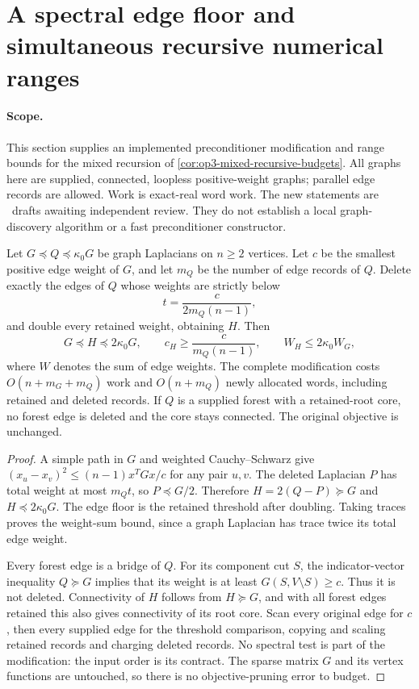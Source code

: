 \section[Recursive numerical ranges]{A spectral edge floor and simultaneous recursive numerical ranges}
\label{sec:op3-recursive-vwf-ranges}

\paragraph{Scope.}
This section supplies an implemented preconditioner modification and
range bounds for the mixed recursion of
\cref{cor:op3-mixed-recursive-budgets}. All graphs here are supplied,
connected, loopless positive-weight graphs; parallel edge records are
allowed. Work is exact-real word work. The new statements are
\statusproved\ drafts awaiting independent review. They do not establish
a local graph-discovery algorithm or a fast preconditioner constructor.

\begin{lemma}
\label{lem:op3-spectral-preconditioner-floor}
Let $G\preceq Q\preceq\kappa_0G$ be graph Laplacians on $n\geq2$
vertices. Let $c$ be the smallest positive edge weight of $G$, and let
$m_Q$ be the number of edge records of $Q$. Delete exactly the edges of
$Q$ whose weights are strictly below
\[
 t=\frac{c}{2m_Q(n-1)},
\]
and double every retained weight, obtaining $H$. Then
\[
 G\preceq H\preceq2\kappa_0G,
 \qquad c_H\geq\frac{c}{m_Q(n-1)},
 \qquad W_H\leq2\kappa_0W_G,
\]
where $W$ denotes the sum of edge weights. The complete modification
costs $O(n+m_G+m_Q)$ work and $O(n+m_Q)$ newly allocated words,
including retained and deleted records.
If $Q$ is a supplied forest with a retained-root core, no forest edge is
deleted and the core stays connected. The original objective is unchanged.
\end{lemma}
\begin{proof}
A simple path in $G$ and weighted Cauchy--Schwarz give
$(x_u-x_v)^2\leq(n-1)x^TGx/c$ for any pair $u,v$.
The deleted Laplacian $P$ has total weight at most $m_Qt$, so
$P\preceq G/2$. Therefore $H=2(Q-P)\succeq G$ and
$H\preceq2\kappa_0G$. The edge floor is the retained threshold after
doubling. Taking traces proves the weight-sum bound, since a graph
Laplacian has trace twice its total edge weight.

Every forest edge is a bridge of $Q$. For its component cut $S$, the
indicator-vector inequality $Q\succeq G$ implies that its weight is at
least $G(S,V\setminus S)\geq c$. Thus it is not deleted. Connectivity
of $H$ follows from $H\succeq G$, and with all forest edges retained
this also gives connectivity of its root core. Scan every original edge
for $c$, then every supplied edge for the threshold comparison, copying
and scaling retained records and charging deleted records. No spectral
test is part of the modification: the input order is its contract.
The sparse matrix $G$ and its vertex functions are untouched, so there
is no objective-pruning error to budget.
\end{proof}

